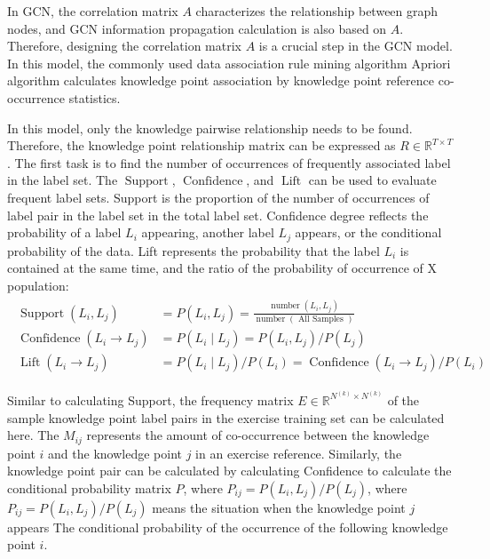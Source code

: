 
In GCN, the correlation matrix \(A\) characterizes the relationship between graph nodes, and GCN information propagation calculation is also based on \(A\). Therefore, designing the correlation matrix \(A\) is a crucial step in the GCN model. In this model, the commonly used data association rule mining algorithm Apriori algorithm calculates knowledge point association by knowledge point reference co-occurrence statistics.

In this model, only the knowledge pairwise relationship needs to be found. Therefore, the knowledge point relationship matrix can be expressed as \(R\in \mathbb{R}^{T\times T}\). The first task is to find the number of occurrences of frequently associated label in the label set. The \(\operatorname{Support}\), \(\operatorname{Confidence}\), and \(\operatorname{Lift}\) can be used to evaluate frequent label sets. Support is the proportion of the number of occurrences of label pair in the label set in the total label set. Confidence degree reflects the probability of a label \(L_i\) appearing, another label \(L_j\) appears, or the conditional probability of the data. Lift represents the probability that the label \(L_i\) is contained at the same time, and the ratio of the probability of occurrence of X population:
\begin{align}
    \begin{split}
        \operatorname{Support}(L_i, L_j)       & =P(L_i,L_j)=\frac{\operatorname{number}(L_i,L_j)}{\operatorname{number}(\text{ All Samples })} \\
        \operatorname{Confidence}(L_i \to L_j) & =P(L_i \mid L_j)=P(L_i, L_j) / P(L_j)                                                \\
        \operatorname{Lift}(L_i \to L_j)       & =P(L_i \mid L_j) / P(L_i)=\operatorname{Confidence}(L_i \to L_j) / P(L_i)
    \end{split}
\end{align}

Similar to calculating Support, the frequency matrix \(E\in \mathbb{R}^{N^{(k)}\times N^{(k)}}\) of the sample knowledge point label pairs in the exercise training set can be calculated here. The \(M_{ij}\) represents the amount of co-occurrence between the knowledge point \(i\) and the knowledge point \(j\) in an exercise reference. Similarly, the knowledge point pair can be calculated by calculating Confidence to calculate the conditional probability matrix \(P\), where \(P_{ij}=P(L_i, L_j)/P(L_j)\), where \(P_{ij}=P(L_i, L_j)/P(L_j)\) means the situation when the knowledge point \(j\) appears The conditional probability of the occurrence of the following knowledge point \(i\).

